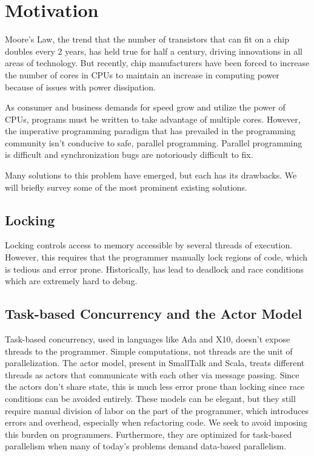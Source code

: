 \section{Motivation}
Moore's Law, the trend that the number of transistors that can fit on a chip
doubles every 2 years, has held true for half a century, driving innovations in
all areas of technology. But recently, chip manufacturers have been forced to
increase the number of cores in CPUs to maintain an increase in computing power
because of issues with power dissipation.

As consumer and business demands for speed grow and utilize the power of CPUs,
programs must be written to take advantage of multiple cores.
However, the imperative programming paradigm that has
prevailed in the programming community isn't conducive to safe,
parallel programming. Parallel programming is difficult and
synchronization bugs are notoriously difficult to fix.

Many solutions to this problem have emerged, but each has its drawbacks. We will
briefly survey some of the most prominent existing solutions.

\subsection{Locking}
Locking controls access to memory accessible by several threads of
execution. However, this requires that the programmer manually lock
regions of code, which is tedious and error prone. Historically, has lead to
deadlock and race conditions which are extremely
hard to debug.

\subsection{Task-based Concurrency and the Actor Model}
Task-based concurrency, used in languages like Ada and X10, doesn't
expose threads to the programmer. Simple computations, not threads are
the unit of parallelization. The actor model, present in SmallTalk and
Scala, treats different threads as actors that communicate with each
other via message passing. Since the actors don't share state, this is
much less error prone than locking since race conditions can be
avoided entirely. These models can be elegant, but they still require
manual division of labor on the part of the programmer, which
introduces errors and overhead, especially when refactoring code. We
seek to avoid imposing this burden on programmers. Furthermore, they are
optimized for task-based parallelism when many of today's problems demand
data-based parallelism.

